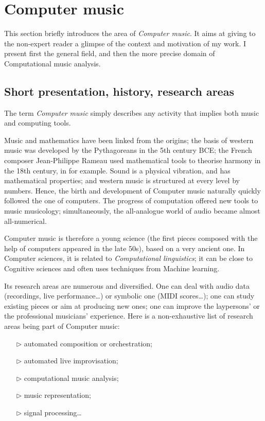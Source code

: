 \documentclass[a4paper,10pt]{article}
\begin{document}
\section{Computer music}

This section briefly introduces the area of \emph{Computer music}. It aims at giving to the non-expert reader a glimpse of the context and motivation of my work. I present first the general field, and then the more precise domain of Computational music analysis.


\subsection{Short presentation, history, research areas}

The term \emph{Computer music} simply describes any activity that implies both music and computing tools.

Music and mathematics have been linked from the origins; the basis of western music was developed by the Pythagoreans in the 5th century BCE; the French composer Jean-Philippe Rameau used mathematical tools to theorise harmony in the 18th century, in \cite{rameau} for example. Sound is a physical vibration, and has mathematical properties; and western music is structured at every level by numbers. Hence, the birth and development of Computer music naturally quickly followed the one of computers. The progress of computation offered new tools to music musicology; simultaneously, the all-analogue world of audio became almost all-numerical.

Computer music is therefore a young science (the first pieces composed with the help of computers appeared in the late 50s), based on a very ancient one. In Computer sciences, it is related to \emph{Computational linguistics}; it can be close to Cognitive sciences and often uses techniques from Machine learning.

Its research areas are numerous and diversified. One can deal with audio data (recordings, live performance\dots) or symbolic one (MIDI scores\dots); one can study existing pieces or aim at producing new ones; one can improve the laypersons' or the professional musicians' experience. Here is a non-exhaustive list of research areas being part of Computer music:

\begin{itemize}
\itemsep0em 
\item[$\triangleright$] automated composition or orchestration;
\item[$\triangleright$] automated live improvisation;
\item[$\triangleright$] computational music analysis;
\item[$\triangleright$] music representation;
\item[$\triangleright$] signal processing\dots
\end{itemize}
\end{document}
